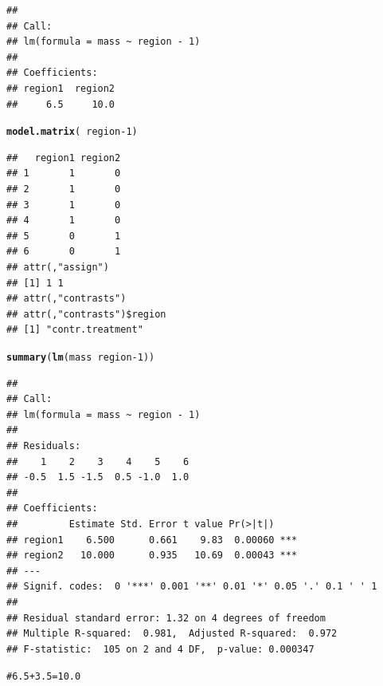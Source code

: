 \documentclass{article}\usepackage[]{graphicx}\usepackage[]{color}
\makeatletter
\newcommand{\hlnum}[1]{\textcolor[rgb]{0.686,0.059,0.569}{#1}}%
\newcommand{\hlopt}[1]{\textcolor[rgb]{0,0,0}{#1}}%
\newcommand{\hlstd}[1]{\textcolor[rgb]{0.345,0.345,0.345}{#1}}%
\newcommand{\hlkwd}[1]{\textcolor[rgb]{0.737,0.353,0.396}{\textbf{#1}}}%
\newenvironment{kframe}{%
 \def\at@end@of@kframe{}%
 \ifinner\ifhmode%
  \def\at@end@of@kframe{\end{minipage}}%
  \begin{minipage}{\columnwidth}%
 \fi\fi%
 \def\FrameCommand##1{\hskip\@totalleftmargin \hskip-\fboxsep
 \colorbox{shadecolor}{##1}\hskip-\fboxsep
     \hskip-\linewidth \hskip-\@totalleftmargin \hskip\columnwidth}%
 \MakeFramed {\advance\hsize-\width
   \@totalleftmargin\z@ \linewidth\hsize
   \@setminipage}}%
 {\par\unskip\endMakeFramed%
 \at@end@of@kframe}
\newenvironment{knitrout}{}{} %
\makeatother
\begin{document}
\begin{knitrout}
\begin{kframe}
\begin{alltt}
\end{alltt}
\begin{verbatim}
## 
## Call:
## lm(formula = mass ~ region - 1)
## 
## Coefficients:
## region1  region2  
##     6.5     10.0
\end{verbatim}
\begin{alltt}
\hlkwd{model.matrix}\hlstd{(}\hlopt{~}\hlstd{region} \hlopt{-} \hlnum{1}\hlstd{)}
\end{alltt}
\begin{verbatim}
##   region1 region2
## 1       1       0
## 2       1       0
## 3       1       0
## 4       1       0
## 5       0       1
## 6       0       1
## attr(,"assign")
## [1] 1 1
## attr(,"contrasts")
## attr(,"contrasts")$region
## [1] "contr.treatment"
\end{verbatim}
\begin{alltt}
\hlkwd{summary}\hlstd{(}\hlkwd{lm}\hlstd{(mass} \hlopt{~} \hlstd{region} \hlopt{-} \hlnum{1}\hlstd{))}
\end{alltt}
\begin{verbatim}
## 
## Call:
## lm(formula = mass ~ region - 1)
## 
## Residuals:
##    1    2    3    4    5    6 
## -0.5  1.5 -1.5  0.5 -1.0  1.0 
## 
## Coefficients:
##         Estimate Std. Error t value Pr(>|t|)    
## region1    6.500      0.661    9.83  0.00060 ***
## region2   10.000      0.935   10.69  0.00043 ***
## ---
## Signif. codes:  0 '***' 0.001 '**' 0.01 '*' 0.05 '.' 0.1 ' ' 1
## 
## Residual standard error: 1.32 on 4 degrees of freedom
## Multiple R-squared:  0.981,	Adjusted R-squared:  0.972 
## F-statistic:  105 on 2 and 4 DF,  p-value: 0.000347
\end{verbatim}
\begin{alltt}
# 6.5 + 3.5 = 10.0
\end{alltt}
\end{kframe}
\end{knitrout}
\end{document}
